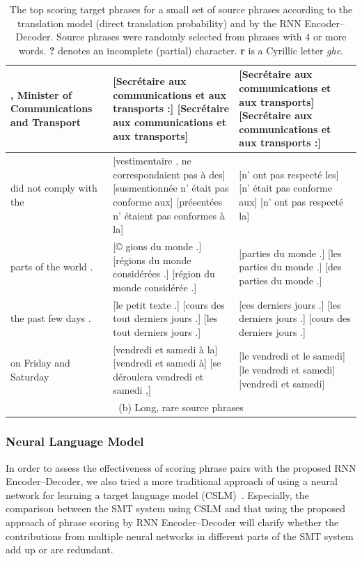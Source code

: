 \begin{table}[t]
\begin{tabular}{p{} | p{} | p{}}
        \hline\hline
        , Minister of Communications and Transport &
[Secrétaire aux communications et aux transports :] [Secrétaire aux communications et aux transports] & 
[Secrétaire aux communications et aux transports] [Secrétaire aux communications et aux transports :]  
        \\
        \hline
        did not comply with the
        &
[vestimentaire , ne correspondaient pas à des] [susmentionnée n' était pas conforme aux] [présentées n' étaient pas conformes à la] & 
[n' ont pas respecté les] [n' était pas conforme aux] [n' ont pas respecté la]  
        \\
        \hline
        parts of the world .
        &
[© gions du monde .] [régions du monde considérées .] [région du monde considérée .] & 
[parties du monde .] [les parties du monde .] [des parties du monde .]  
        \\
        \hline
        the past few days .
        &
[le petit texte .] [cours des tout derniers jours .] [les tout derniers jours .] &
[ces derniers jours .] [les derniers jours .] [cours des derniers jours .]
        \\
        \hline
on Friday and Saturday
        &
[vendredi et samedi à la] [vendredi et samedi à] [se déroulera vendredi et samedi ,] &
[le vendredi et le samedi] [le vendredi et samedi] [vendredi et samedi]
        \\
        \hline
        \multicolumn{3}{c}{(b) Long, rare source phrases}\\
    \end{tabular}
    \caption{The top scoring target phrases for a small set of source phrases according to
    the translation model (direct translation probability) and by the RNN Encoder--Decoder. Source
    phrases were randomly selected from phrases with 4 or more words.
    {\bf ?} denotes an incomplete (partial) character. {\bf r} is a Cyrillic letter {\it ghe}.}
\label{tbl:samples}
    \vspace{-3mm}
\end{table}

\subsubsection{Neural Language Model}

In order to assess the effectiveness of scoring phrase pairs with the proposed
RNN Encoder--Decoder, we also tried a more traditional approach of using a
neural network for learning a target language model
(CSLM)~\mbox{\cite{Schwenk2007}}.  Especially, the comparison between the SMT
system using CSLM and that using the proposed approach of phrase scoring by RNN
Encoder--Decoder will clarify whether the contributions from multiple neural
networks in different parts of the SMT system add up or are redundant.

